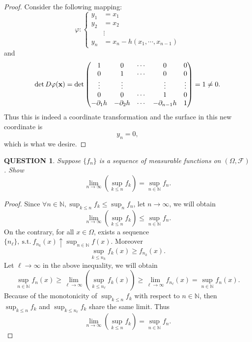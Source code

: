 \documentclass[12pt]{article}
\renewcommand{\(}{\left(}%
\renewcommand{\)}{\right)}%
\renewcommand{\[}{\left[}%
\renewcommand{\]}{\right]}%
\newcommand{\n}{\mathbb{N}}
\newcommand{\f}{\mathscr{F}}
\newcommand{\st}{\mathrm{\ s.t.\ }}
\newcommand{\li}{\lim\limits_}
\newtheorem{question}{QUESTION}[section]}
\newtheorem{proof}{Proof.}}
\begin{document}
\begin{proof}
   Consider the following mapping:
   \begin{equation*}
    \varphi: \left\{
    \begin{split}
     y_1&=x_1\\
     y_2&=x_2\\
     &\vdots\\
     y_n&=x_n-h(x_1,\cdots,x_{n-1} )
    \end{split}\right.
   \end{equation*}
   and
   \begin{equation*}
     \det D\varphi(\text{\rmfamily \bfseries x} )=\det
    \begin{pmatrix}
     1 & 0 & \cdots & 0 & 0\\
     0 & 1 & \cdots & 0 & 0\\
     \vdots & \vdots & & \vdots & \vdots\\
     0 & 0 & \cdots & 1 &0\\
     -\partial_1 h & -\partial_2 h & \cdots & -\partial_{n-1} h & 1
    \end{pmatrix}
    =1\neq 0.
   \end{equation*}
   Thus this is indeed a coordinate transformation and the surface in this new coordinate is
   \begin{equation*}
    y_n=0,
   \end{equation*}
   which is what we desire.
  \end{proof}

  \begin{question}
   Suppose $\{f_n\}$ is a sequence of measurable functions on $(\Omega,\f )$.  Show
   \begin{equation*}
    \li{n\to\infty}\(\sup_{k\leq n}f_k\)=\sup_{n\in\n}f_n.
   \end{equation*}
  \end{question}
  \begin{proof}
   Since $\forall n\in\n,\sup_{k\leq n}f_k\leq \sup_nf_n$, let $n\to\infty$, we will obtain
   \begin{equation*}
    \li{n\to\infty}\(\sup_{k\leq n}f_k\)\leq \sup_{n\in\n}f_n.
   \end{equation*}
   On the contrary, for all $x\in\Omega$, exists a sequence $\{n_\ell\},\st f_{n_k}(x)\uparrow \sup_{n\in\n}f(x)$. Moreover
   \begin{equation*}
    \sup_{k\leq n_k}f_k(x)\geq f_{n_k}(x).
   \end{equation*}
   Let $\ell\to\infty$ in the above inequality, we will obtain
   \begin{equation*}
    \sup_{n\in\n}f_n(x)\geq \li{\ell\to\infty}\(\sup_{k\leq n_\ell}f_k(x)\)\geq\li{\ell\to\infty} f_{n_\ell}(x)=\sup_{n\in\n}f_n(x).
   \end{equation*}
   Because of the monotonicity of $\sup_{k\leq n}f_k$ with respect to $n\in\n$, then $\sup_{k\leq n}f_k$ and $\sup_{k\leq n_\ell}f_k$ share the same limit. Thus
   \begin{equation*}
    \li{n\to\infty}\(\sup_{k\leq n}f_k\)=\sup_{n\in\n}f_n.
   \end{equation*}
  \end{proof}
\end{document}
